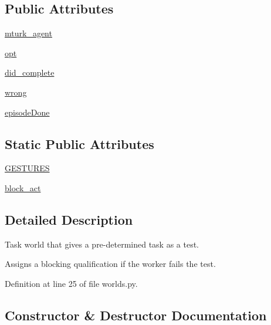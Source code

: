 \subsection*{Public Attributes}
\begin{DoxyCompactItemize}
\item 
\hyperlink{classlight__chat__eval_1_1worlds_1_1LightEvalTestWorld_a4d4fdebfcb25486f1ef39d349aee472d}{mturk\+\_\+agent}
\item 
\hyperlink{classlight__chat__eval_1_1worlds_1_1LightEvalTestWorld_af30a480a616bdff00533b91ea3bbb5ce}{opt}
\item 
\hyperlink{classlight__chat__eval_1_1worlds_1_1LightEvalTestWorld_afe28ccafcf819129c3d98b19a5002a31}{did\+\_\+complete}
\item 
\hyperlink{classlight__chat__eval_1_1worlds_1_1LightEvalTestWorld_ac3f300a69906b04a0f0372712b3ae8ef}{wrong}
\item 
\hyperlink{classlight__chat__eval_1_1worlds_1_1LightEvalTestWorld_ac20e00446776ea56707bc1e98a52ce35}{episode\+Done}
\end{DoxyCompactItemize}
\subsection*{Static Public Attributes}
\begin{DoxyCompactItemize}
\item 
\hyperlink{classlight__chat__eval_1_1worlds_1_1LightEvalTestWorld_aa52cfc2c62b730cf0240a26dacfe14e9}{G\+E\+S\+T\+U\+R\+ES}
\item 
\hyperlink{classlight__chat__eval_1_1worlds_1_1LightEvalTestWorld_af50e5abf74c553f1bcefd375f809560b}{block\+\_\+act}
\end{DoxyCompactItemize}


\subsection{Detailed Description}
\begin{DoxyVerb}Task world that gives a pre-determined task as a test.

Assigns a blocking qualification if the worker fails the test.
\end{DoxyVerb}
 

Definition at line 25 of file worlds.\+py.



\subsection{Constructor \& Destructor Documentation}
\mbox{\label{classlight__chat__eval_1_1worlds_1_1LightEvalTestWorld_abe875bf151cf111e838b6844d08620e1}} 
